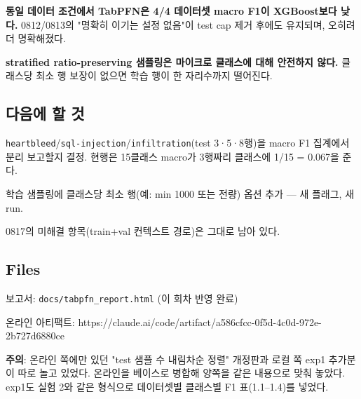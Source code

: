 \par\noindent \textbullet\enspace \textbf{동일 데이터 조건에서 TabPFN은 4/\allowbreak{}4 데이터셋 macro F1이 XGBoost보다 낮다.} 0812/\allowbreak{}0813의 "명확히 이기는 설정 없음"이 test cap 제거 후에도 유지되며, 오히려 더 명확해졌다.


\par\noindent \textbullet\enspace \textbf{stratified ratio-preserving 샘플링은 마이크로 클래스에 대해 안전하지 않다.} 클래스당 최소 행 보장이 없으면 학습 행이 한 자리수까지 떨어진다.


\subsection{다음에 할 것}
\par\noindent \textbullet\enspace [ ] \texttt{heartble\allowbreak{}ed}/\allowbreak{}\texttt{sql-\allowbreak{}inje\allowbreak{}ction}/\allowbreak{}\texttt{infiltra\allowbreak{}tion}(test 3·5·8행)을 macro F1 집계에서 분리 보고할지 결정. 현행은 15클래스 macro가 3행짜리 클래스에 1/\allowbreak{}15 =\allowbreak{} 0.067을 준다.


\par\noindent \textbullet\enspace [ ] 학습 샘플링에 클래스당 최소 행(예: min 1000 또는 전량) 옵션 추가 — 새 플래그, 새 run.


\par\noindent \textbullet\enspace [ ] 0817의 미해결 항목(train+\allowbreak{}val 컨텍스트 경로)은 그대로 남아 있다.


\subsection{Files}
\par\noindent \textbullet\enspace 보고서: \texttt{docs/\allowbreak{}\allowbreak{}tab\allowbreak{}pfn\_\allowbreak{}\allowbreak{}repo\allowbreak{}rt.\allowbreak{}html} (이 회차 반영 완료)

\par\noindent \textbullet\enspace 온라인 아티팩트: https:/\allowbreak{}/\allowbreak{}claude.ai/\allowbreak{}code/\allowbreak{}artifact/\allowbreak{}a586cfcc-0f5d-4c0d-972e-2b727d6880ce


\par\noindent \textbullet\enspace \textbf{주의}: 온라인 쪽에만 있던 "test 샘플 수 내림차순 정렬" 개정판과 로컬 쪽 exp1 추가분이 따로 놀고 있었다. 온라인을 베이스로 병합해 양쪽을 같은 내용으로 맞춰 놓았다. exp1도 실험 2와 같은 형식으로 데이터셋별 클래스별 F1 표(1.1–1.4)를 넣었다.



